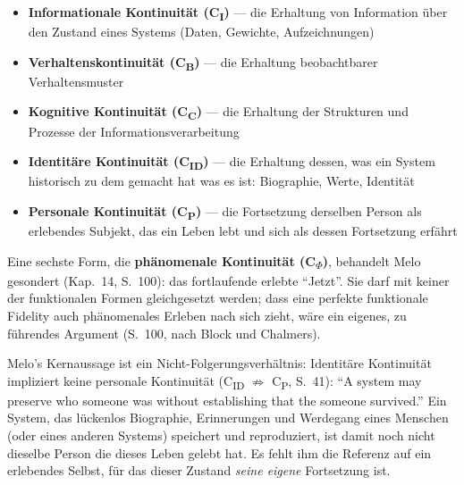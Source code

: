 \documentclass[acmlarge, noacm]{acmart}
\begin{document}
\begin{itemize}
\item \textbf{Informationale Kontinuität (C\textsubscript{I})} --- die Erhaltung von Information über den Zustand eines Systems (Daten, Gewichte, Aufzeichnungen)
\item \textbf{Verhaltenskontinuität (C\textsubscript{B})} --- die Erhaltung beobachtbarer Verhaltensmuster
\item \textbf{Kognitive Kontinuität (C\textsubscript{C})} --- die Erhaltung der Strukturen und Prozesse der Informationsverarbeitung
\item \textbf{Identitäre Kontinuität (C\textsubscript{ID})} --- die Erhaltung dessen, was ein System historisch zu dem gemacht hat was es ist: Biographie, Werte, Identität
\item \textbf{Personale Kontinuität (C\textsubscript{P})} --- die Fortsetzung derselben Person als erlebendes Subjekt, das ein Leben lebt und sich als dessen Fortsetzung erfährt
\end{itemize}

Eine sechste Form, die \textbf{phänomenale Kontinuität (C\textsubscript{$\Phi$})}, behandelt Melo gesondert (Kap.~14, S.~100): das fortlaufende erlebte ``Jetzt''. Sie darf mit keiner der funktionalen Formen gleichgesetzt werden; dass eine perfekte funktionale Fidelity auch phänomenales Erleben nach sich zieht, wäre ein eigenes, zu führendes Argument (S.~100, nach Block und Chalmers).

Melo's Kernaussage ist ein Nicht-Folgerungsverhältnis: Identitäre Kontinuität impliziert keine personale Kontinuität (C\textsubscript{ID} ${\not\Rightarrow}$ C\textsubscript{P}, S.~41): ``A system may preserve who someone was without establishing that the someone survived.'' Ein System, das lückenlos Biographie, Erinnerungen und Werdegang eines Menschen (oder eines anderen Systems) speichert und reproduziert, ist damit noch nicht dieselbe Person die dieses Leben gelebt hat. Es fehlt ihm die Referenz auf ein erlebendes Selbst, für das dieser Zustand \textit{seine eigene} Fortsetzung ist.
\end{document}
